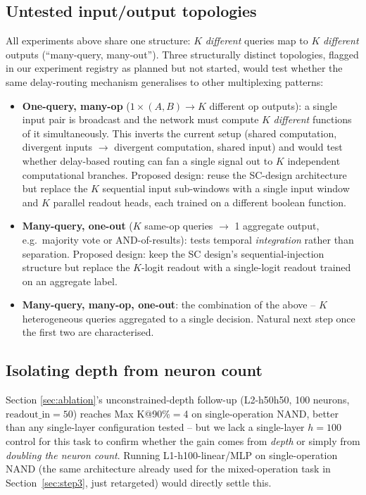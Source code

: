 \documentclass[conference]{IEEEtran}
\begin{document}
\subsection{Untested input/output topologies}
All experiments above share one structure: $K$ \emph{different} queries map to $K$
\emph{different} outputs (``many-query, many-out''). Three structurally distinct
topologies, flagged in our experiment registry as planned but not started, would test
whether the same delay-routing mechanism generalises to other multiplexing patterns:
\begin{itemize}
\item \textbf{One-query, many-op} ($1\times(A,B)\to K$ different op outputs): a single
input pair is broadcast and the network must compute $K$ \emph{different} functions of
it simultaneously. This inverts the current setup (shared computation, divergent inputs
$\to$ divergent computation, shared input) and would test whether delay-based routing
can fan a single signal out to $K$ independent computational branches. Proposed design:
reuse the SC-design architecture but replace the $K$ sequential input sub-windows with a
single input window and $K$ parallel readout heads, each trained on a different boolean
function.
\item \textbf{Many-query, one-out} ($K$ same-op queries $\to$ 1 aggregate output, e.g.\
majority vote or AND-of-results): tests temporal \emph{integration} rather than
separation. Proposed design: keep the SC design's sequential-injection structure but replace
the $K$-logit readout with a single-logit readout trained on an aggregate label.
\item \textbf{Many-query, many-op, one-out}: the combination of the above -- $K$
heterogeneous queries aggregated to a single decision. Natural next step once the first
two are characterised.
\end{itemize}

\subsection{Isolating depth from neuron count}
Section \ref{sec:ablation}'s unconstrained-depth follow-up (L2-h50h50, 100 neurons,
$\text{readout\_in}{=}50$) reaches Max K@90\%$=$4 on single-operation NAND, better than
any single-layer configuration tested -- but we lack a single-layer $h{=}100$ control for
this task to confirm whether the gain comes from \emph{depth} or simply from
\emph{doubling the neuron count}. Running L1-h100-linear/MLP on single-operation NAND
(the same architecture already used for the mixed-operation task in
Section~\ref{sec:step3}, just retargeted) would directly settle this.
\end{document}
